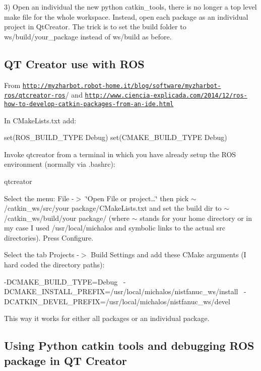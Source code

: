 3) Open an individual the new python catkin\-\_\-tools, there is no longer a top level make file for the whole workspace. Instead, open each package as an individual project in Qt\-Creator. The trick is to set the build folder to ws/build/your\-\_\-package instead of ws/build as before.

\subsection*{Q\-T Creator use with R\-O\-S }

From {\ttfamily \href{http://myzharbot.robot-home.it/blog/software/myzharbot-ros/qtcreator-ros}{\tt http\-://myzharbot.\-robot-\/home.\-it/blog/software/myzharbot-\/ros/qtcreator-\/ros}}/ and {\ttfamily \href{http://www.ciencia-explicada.com/2014/12/ros-how-to-develop-catkin-packages-from-an-ide.html}{\tt http\-://www.\-ciencia-\/explicada.\-com/2014/12/ros-\/how-\/to-\/develop-\/catkin-\/packages-\/from-\/an-\/ide.\-html}}

In C\-Make\-Lists.\-txt add\-: \begin{DoxyVerb}set(ROS_BUILD_TYPE Debug)
set(CMAKE_BUILD_TYPE Debug)
\end{DoxyVerb}


Invoke qtcreator from a terminal in which you have already setup the R\-O\-S environment (normally via .bashrc)\-: \begin{DoxyVerb}qtcreator
\end{DoxyVerb}


Select the menu\-: {\ttfamily File -\/$>$ \char`\"{}\-Open File or project…\char`\"{}} then pick {\ttfamily $\sim$/catkin\-\_\-ws/src/your package/\-C\-Make\-Lists.\-txt} and set the build dir to {\ttfamily $\sim$/catkin\-\_\-ws/build/your package/} (where $\sim$ stands for your home directory or in my case I used /usr/local/michalos and symbolic links to the actual src directories). Press Configure.

Select the tab {\ttfamily Projects -\/$>$ Build Settings} and add these C\-Make arguments (I hard coded the directory paths)\-: \begin{DoxyVerb}-DCMAKE_BUILD_TYPE=Debug \
           -DCMAKE_INSTALL_PREFIX=/usr/local/michalos/nistfanuc_ws/install \
           -DCATKIN_DEVEL_PREFIX=/usr/local/michalos/nistfanuc_ws/devel
\end{DoxyVerb}


This way it works for either all packages or an individual package.

\subsection*{Using Python catkin tools and debugging R\-O\-S package in Q\-T Creator }

